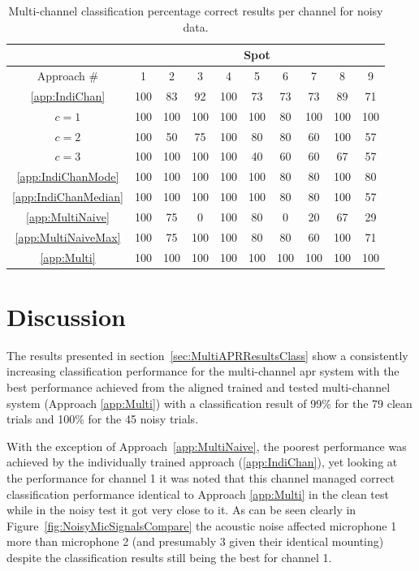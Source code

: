 \begin{table}\begin{center}
\caption{Multi-channel classification percentage correct results per channel for noisy data.}
\label{tab:multiAPRresultsNoisePerChan}
\begin{tabular}{|c|c|c|c|c|c|c|c|c|c|}\hline
  & \multicolumn{9}{|c|}{Spot} \\
\hline
Approach \#             & 1   & 2   & 3   & 4   & 5   & 6   & 7   & 8   & 9  \\ \hline 
\ref{app:IndiChan}      & 100 &  83 &  92 & 100 &  73 &  73 &  73 &  89 &  71  \\
$c = 1$                 & 100 & 100 & 100 & 100 & 100 &  80 & 100 & 100 & 100  \\
$c = 2$                 & 100 &  50 &  75 & 100 &  80 &  80 &  60 & 100 &  57  \\
$c = 3$                 & 100 & 100 & 100 & 100 &  40 &  60 &  60 &  67 &  57  \\
\ref{app:IndiChanMode}  & 100 & 100 & 100 & 100 & 100 &  80 &  80 & 100 &  80  \\
\ref{app:IndiChanMedian}& 100 & 100 & 100 & 100 & 100 &  80 &  80 & 100 &  57  \\
\ref{app:MultiNaive}    & 100 &  75 &   0 & 100 &  80 &   0 &  20 &  67 &  29  \\
\ref{app:MultiNaiveMax} & 100 &  75 & 100 & 100 &  80 &  80 &  60 & 100 &  71  \\
\ref{app:Multi}         & 100 & 100 & 100 & 100 & 100 & 100 & 100 & 100 & 100  \\ \hline
\end{tabular}\end{center}\end{table}


\section{Discussion}
The results presented in section~\ref{sec:MultiAPRResultsClass} show a consistently increasing classification performance for the multi-channel \gls{apr} system with the best performance achieved from the aligned trained and tested multi-channel system (Approach \ref{app:Multi}) with a classification result of 99\% for the 79 clean trials and 100\% for the 45 noisy trials.

With the exception of Approach~\ref{app:MultiNaive}, the poorest performance was achieved by the individually trained approach (\ref{app:IndiChan}), yet looking at the performance for channel 1 it was noted that this channel managed correct classification performance identical to Approach \ref{app:Multi} in the clean test while in the noisy test it got very close to it. As can be seen clearly in Figure~\ref{fig:NoisyMicSignalsCompare} the acoustic noise affected microphone 1 more than microphone 2 (and presumably 3 given their identical mounting) despite the classification results still being the best for channel 1.

